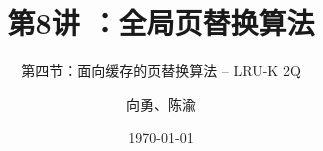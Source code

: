 



\title[第8讲]{第8讲 ：全局页替换算法} %
\subtitle{第四节：面向缓存的页替换算法 -- LRU-K 2Q}
\author{向勇、陈渝} %
\date{\today} %




\begin{frame}
\titlepage %
\end{frame}

%

